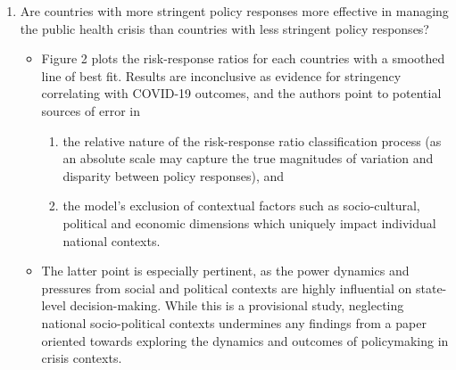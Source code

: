 \documentclass[12pt,letterpaper]{article}
\begin{document}
\begin{enumerate}
\begin{itemize}
			
		\end{itemize}
		
		\item Are countries with more stringent policy responses more effective in managing the public health crisis than countries with less stringent policy responses?
		
		\begin{itemize}
			\item Figure 2 plots the risk-response ratios for each countries with a smoothed line of best fit. Results are inconclusive as evidence for stringency correlating with COVID-19 outcomes, and the authors point to potential sources of error in
			
			\begin{enumerate}
				\item the relative nature of the risk-response ratio classification process (as an absolute scale may capture the true magnitudes of variation and disparity between policy responses), and
				\item the model's exclusion of contextual factors such as socio-cultural, political and economic dimensions which uniquely impact individual national contexts.
			\end{enumerate}
			
			\item The latter point is especially pertinent, as the power dynamics and pressures from social and political contexts are highly influential on state-level decision-making. While this is a provisional study, neglecting national socio-political contexts undermines any findings from a paper oriented towards exploring the dynamics and outcomes of policymaking in crisis contexts.
		

\end{itemize}
\end{enumerate}
\end{document}

